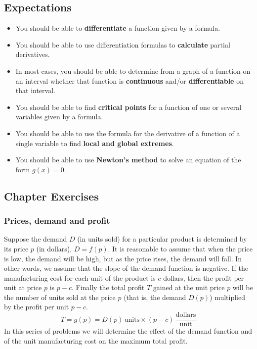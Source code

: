 \subsection{Expectations}
\label{subsec:expectations}

\begin{itemize}

\item You should be able to {\bf differentiate} a function given by a
  formula.

\item You should be able to use differentiation formulas to {\bf
  calculate} partial derivatives.

\item In most cases, you should be able to determine from a graph of a
  function on an interval whether that function is {\bf continuous}
  and/or {\bf differentiable} on that interval.

\item You should be able to find {\bf critical points} for a function
  of one or several variables given by a formula.

\item You should be able to use the formula for the derivative of a
  function of a single variable to find {\bf local and global
    extremes}.

\item You should be able to use {\bf Newton's method} to solve an
  equation of the form $g(x)=0$.

\end{itemize}

\subsection{Chapter Exercises}
\label{subsec:chapter-exercises}

\subsubsection{Prices, demand and profit}  
\label{subsubsec:prices-demand-and-profit}

Suppose the demand $D$ (in units sold) for a particular
product is determined by its price $p$ (in dollars), $D=f(p)$.  It is
reasonable to assume that when the price is low, the demand will be
high, but as the price rises, the demand will fall.  In other words,
we assume that the slope of the demand function is negative.  If the
manufacturing cost for each unit of the product is $c$ dollars, then
the profit per unit at price $p$ is $p-c$.  Finally the total profit
$T$ gained at the unit price $p$ will be the number of units sold at
the price $p$ (that is, the demand $D(p)$) multiplied by the profit
per unit $p-c$.
	\[
T = g(p) = D(p)\, \mbox{units} \times (p-c) \, 
		\frac{\mbox{dollars}}{\mbox{unit}}
\]
In this series of problems we will determine the effect of the demand
function and of the unit manufacturing cost on the maximum total
profit.



